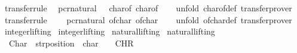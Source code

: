 \begin{isabellebody}
\isamarkupfalse%
\ {\isacharbrackleft}{\kern0pt}transfer{\isacharunderscore}{\kern0pt}rule{\isacharbrackright}{\kern0pt}{\isacharcolon}{\kern0pt}\isanewline
\ \ {\isacartoucheopen}{\isacharparenleft}{\kern0pt}pcr{\isacharunderscore}{\kern0pt}natural\ {\isacharequal}{\kern0pt}{\isacharequal}{\kern0pt}{\isacharequal}{\kern0pt}{\isachargreater}{\kern0pt}\ {\isacharparenleft}{\kern0pt}{\isacharequal}{\kern0pt}{\isacharparenright}{\kern0pt}{\isacharparenright}{\kern0pt}\ char{\isacharunderscore}{\kern0pt}of\ char{\isacharunderscore}{\kern0pt}of{\isacartoucheclose}\isanewline
%
\isadelimproof
\ \ %
\endisadelimproof
%
\isatagproof
{}\isamarkupfalse%
\ {\isacharparenleft}{\kern0pt}unfold\ char{\isacharunderscore}{\kern0pt}of{\isacharunderscore}{\kern0pt}def{\isacharparenright}{\kern0pt}\ transfer{\isacharunderscore}{\kern0pt}prover%
\endisatagproof
{\isafoldproof}%
%
\isadelimproof
\isanewline
%
\endisadelimproof
\isanewline
{}\isamarkupfalse%
\ {\isacharbrackleft}{\kern0pt}transfer{\isacharunderscore}{\kern0pt}rule{\isacharbrackright}{\kern0pt}{\isacharcolon}{\kern0pt}\isanewline
\ \ {\isacartoucheopen}{\isacharparenleft}{\kern0pt}{\isacharparenleft}{\kern0pt}{\isacharequal}{\kern0pt}{\isacharparenright}{\kern0pt}\ {\isacharequal}{\kern0pt}{\isacharequal}{\kern0pt}{\isacharequal}{\kern0pt}{\isachargreater}{\kern0pt}\ pcr{\isacharunderscore}{\kern0pt}natural{\isacharparenright}{\kern0pt}\ of{\isacharunderscore}{\kern0pt}char\ of{\isacharunderscore}{\kern0pt}char{\isacartoucheclose}\isanewline
%
\isadelimproof
\ \ %
\endisadelimproof
%
\isatagproof
{}\isamarkupfalse%
\ {\isacharparenleft}{\kern0pt}unfold\ of{\isacharunderscore}{\kern0pt}char{\isacharunderscore}{\kern0pt}def{\isacharparenright}{\kern0pt}\ transfer{\isacharunderscore}{\kern0pt}prover%
\endisatagproof
{\isafoldproof}%
%
\isadelimproof
\isanewline
%
\endisadelimproof
\isanewline
{}\isamarkupfalse%
\isanewline
\isanewline
{}\isamarkupfalse%
\ integer{\isachardot}{\kern0pt}lifting\isanewline
{}\isamarkupfalse%
\ integer{\isachardot}{\kern0pt}lifting\isanewline
\isanewline
{}\isamarkupfalse%
\ natural{\isachardot}{\kern0pt}lifting\isanewline
{}\isamarkupfalse%
\ natural{\isachardot}{\kern0pt}lifting\isanewline
\isanewline
{}\isamarkupfalse%
\isanewline
\ \ {\isachardoublequoteopen}{\isacharunderscore}{\kern0pt}Char{\isachardoublequoteclose}\ {\isacharcolon}{\kern0pt}{\isacharcolon}{\kern0pt}\ {\isachardoublequoteopen}str{\isacharunderscore}{\kern0pt}position\ {\isasymRightarrow}\ char{\isachardoublequoteclose}\ \ \ \ {\isacharparenleft}{\kern0pt}{\isachardoublequoteopen}CHR\ {\isacharunderscore}{\kern0pt}{\isachardoublequoteclose}{\isacharparenright}{\kern0pt}\isanewline

\end{isabellebody}
